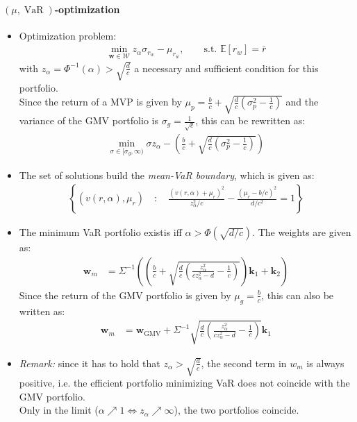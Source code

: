 \documentclass[a4paper,landscape,8pt,fleqn]{scrartcl}
\DeclareMathOperator{\VaR}{VaR}				%
\begin{document}
\begin{multicols*}{3}
\paragraph{$(\mu, \VaR)$-optimization}
\begin{itemize}
\item Optimization problem:
\begin{align*}
\min_{\bm w \in \mathcal{W}} z_\alpha \sigma_{r_w} - \mu_{r_w}, \qquad \text{s.t. } \mathbb{E}[r_w] = \bar r
\end{align*}
with $z_\alpha = \Phi^{-1}(\alpha) > \sqrt{\frac{d}{c}}$ a necessary and sufficient condition for this portfolio. \\
Since the return of a MVP is given by $\mu_p = \frac{b}{c} + \sqrt{\frac{d}{c} \left( \sigma_p^2 - \frac{1}{c} \right)}$ and the variance of the GMV portfolio is $\sigma_g = \frac{1}{\sqrt{c}}$, this can be rewritten as:
\begin{align*}
\min_{\sigma \in [\sigma_g, \infty)} \sigma z_\alpha - \left( \frac{b}{c} + \sqrt{\frac{d}{c} \left( \sigma_p^2 - \frac{1}{c} \right)} \right)
\end{align*}
\item The set of solutions build the \textit{mean-VaR boundary}, which is given as:
\begin{align*}
\left\lbrace (v(r,\alpha), \mu_r) \quad : \quad \frac{(v(r,\alpha) + \mu_r)^2}{z_\alpha^2 / c} - \frac{(\mu_r - b/c)^2}{d/c^2} = 1 \right\rbrace
\end{align*}
\item The minimum VaR portfolio existis iff $\alpha > \Phi(\sqrt{d/c})$. The weights are given as:
\begin{align*}
\bm w_m &= \Sigma^{-1} \left(  \left( \frac{b}{c} + \sqrt{\frac{d}{c} \left( \frac{z_\alpha^2}{c z_\alpha^2 - d} - \frac{1}{c} \right)} \right) \bm k_1 + \bm k_2 \right)
\end{align*}
Since the return of the GMV portfolio is given by $\mu_g = \frac{b}{c}$, this can also be written as:
\begin{align*}
\bm w_m &= \bm w_\text{GMV} + \Sigma^{-1} \sqrt{\frac{d}{c} \left( \frac{z_\alpha^2}{c z_\alpha^2 - d} - \frac{1}{c} \right)} \bm k_1
\end{align*}
\item \textit{Remark:} since it has to hold that $z_\alpha > \sqrt{\frac{d}{c}}$, the second term in $w_m$ is always positive, i.e. the efficient portfolio minimizing VaR does not coincide with the GMV portfolio. \\
Only in the limit ($\alpha \nearrow 1 \Leftrightarrow z_\alpha \nearrow \infty$), the two portfolios coincide.
\end{itemize}


\end{multicols*}
\end{document}

